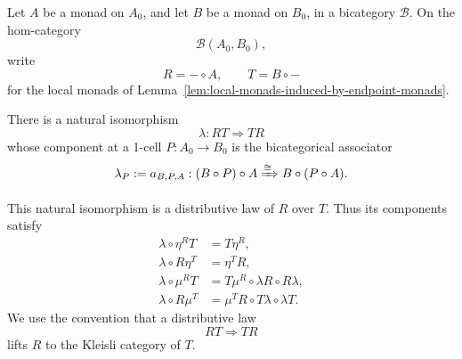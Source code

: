 \begin{lemma}
\label{lem:endpoint-distributive-law}
    Let \(A\) be a monad on \(A_0\), and let \(B\) be a monad on \(B_0\), in a
    bicategory \(\mathcal B\). On the hom-category
    \[
        \mathcal B(A_0,B_0),
    \]
    write
    \[
        R=-\circ A,
        \qquad
        T=B\circ-
    \]
    for the local monads of
    Lemma~\ref{lem:local-monads-induced-by-endpoint-monads}.

    There is a natural isomorphism
    \[
        \lambda:RT\Rightarrow TR
    \]
    whose component at a 1-cell \(P:A_0\to B_0\) is the bicategorical
    associator
    \[
        \lambda_P
        :=
        a_{B,P,A}:
        (B\circ P)\circ A
        \xRightarrow{\cong}
        B\circ(P\circ A).
    \]

    This natural isomorphism is a distributive law of \(R\) over \(T\). Thus
    its components satisfy
    \begin{align}
        \lambda\circ\eta^R T
        &=
        T\eta^R,
        \label{eq:endpoint-distributive-R-unit}
        \\
        \lambda\circ R\eta^T
        &=
        \eta^T R,
        \label{eq:endpoint-distributive-T-unit}
        \\
        \lambda\circ\mu^R T
        &=
        T\mu^R\circ\lambda R\circ R\lambda,
        \label{eq:endpoint-distributive-R-multiplication}
        \\
        \lambda\circ R\mu^T
        &=
        \mu^T R\circ T\lambda\circ\lambda T.
        \label{eq:endpoint-distributive-T-multiplication}
    \end{align}
    We use the convention that a distributive law
    \[
        RT\Rightarrow TR
    \]
    lifts \(R\) to the Kleisli category of \(T\).
\end{lemma}
